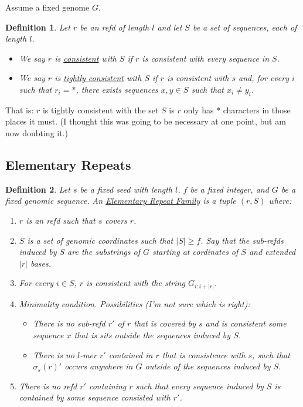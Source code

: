 \documentclass{article}
\newtheorem{definition}{Definition}
\begin{document}
Assume a fixed genome $G$.

\begin{definition}
Let $r$ be an refd of length $l$ and let $S$ be a set of sequences,
each of length $l$.
\begin{itemize}
\item We say $r$ is \underline{consistent} with $S$ if $r$ is
  consistent with every sequence in $S$.
\item We say $r$ is \underline{tightly consistent} with $S$ if $r$ is
  consistent with $s$ and, for every $i$ such that $r_i=*$, there
  exists sequences $x,y \in S$ such that $x_i \neq y_i$.
\end{itemize}
\end{definition}
That is: $r$ is tightly consistent with the set $S$ is $r$ only has
$*$ characters in those places it must.  (I thought this was going to
be necessary at one point, but am now doubting it.)




\subsection{Elementary Repeats}

\begin{definition}
Let $s$ be a fixed seed with length $l$, $f$ be a fixed integer, and $G$ be a fixed
genomic sequence.  An
\underline{Elementary Repeat Family} is a tuple $(r,S)$ where: 
\begin{enumerate}
\item $r$ is an refd such that $s$ covers $r$. 
\item $S$ is a set of genomic coordinates such that $|S| \geq f$.  Say
  that the sub-refds induced by $S$ are the substrings of $G$ starting
  at cordinates of $S$ and extended $|r|$ bases.
\item For every $i \in S$, $r$ is consistent with the string
  $G_{i:i+|r|}$.
\item Minimality condition.  Possibilities (I'm not sure which is
  right):
  \begin{itemize}
  \item There is no sub-refd $r'$ of $r$ that is covered by $s$ and is
     consistent some sequence $x$ that is sits outside the sequences
      induced by $S$.
  \item There is no $l$-mer $r'$ contained in $r$ that is consistence
    with $s$, such that $\sigma_s(r)'$ occurs anywhere in $G$ outside
    of the sequences induced by $S$.
 \end{itemize}
\item There is no refd $r'$ containing $r$ such that every sequence
  induced by $S$ is contained by some sequence consisted with $r'$.
\end{enumerate}
\end{definition}
\end{document}
